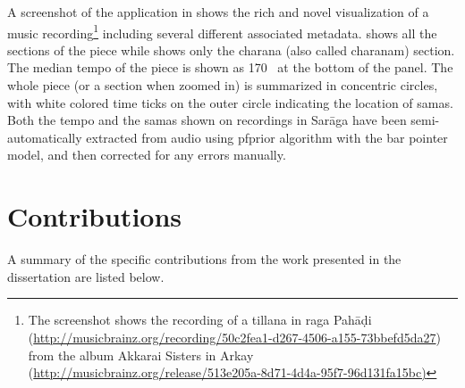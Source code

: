 A screenshot of the application in  shows the rich and novel visualization of a music recording\footnote{The screenshot shows the recording of a \gls{tillana} in \gls{raga} Pahāḍi (\url{http://musicbrainz.org/recording/50c2fea1-d267-4506-a155-73bbefd5da27}) from the album Akkarai Sisters in Arkay (\url{http://musicbrainz.org/release/513e205a-8d71-4d4a-95f7-96d131fa15bc)}} including several different associated metadata.  shows all the sections of the piece while  shows only the \gls{charana} (also called \gls{charana}m) section. The median tempo of the piece is shown as 170 \bpm\ at the bottom of the panel. The whole piece (or a section when zoomed in) is summarized in concentric circles, with white colored time ticks on the outer circle indicating the location of \glspl{sama}. Both the tempo and the \glspl{sama} shown on recordings in Sar\={a}ga have been semi-automatically extracted from audio using \acrshort{pfprior} algorithm with the bar pointer model, and then corrected for any errors manually. 

\section{Contributions}
A summary of the specific contributions from the work presented in the dissertation are listed below. %
